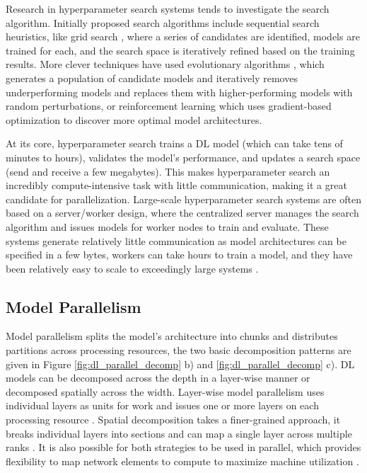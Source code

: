 Research in hyperparameter search systems tends to investigate the search algorithm. 
Initially proposed search algorithms include sequential search heuristics, like grid search \cite{Hadjis2016Omnivore}, where a series of candidates are identified, models are trained for each, and the search space is iteratively refined based on the training results.
More clever techniques have used evolutionary algorithms \cite{Young2017EvolveNLWithHPC, Real2017LargeScaleEvolutionOfCV}, which generates a population of candidate models and iteratively removes underperforming models and replaces them with higher-performing models with random perturbations, or reinforcement learning \cite{Zoph2017NeuralArchSearchReinformceLearn} which uses gradient-based optimization to discover more optimal model architectures.

At its core, hyperparameter search trains a \gls{DL} model (which can take tens of minutes to hours), validates the model's performance, and updates a search space (send and receive a few megabytes).
This makes hyperparameter search an incredibly compute-intensive task with little communication, making it a great candidate for parallelization.
Large-scale hyperparameter search systems are often based on a server/worker design, where the centralized server manages the search algorithm and issues models for worker nodes to train and evaluate.
These systems generate relatively little communication as model architectures can be specified in a few bytes, workers can take hours to train a model, and they have been relatively easy to scale to exceedingly large systems \cite{Young2017EvolveNLWithHPC}.

\subsection{Model Parallelism}


Model parallelism splits the model's architecture into chunks and distributes partitions across processing resources, the two basic decomposition patterns are given in Figure \ref{fig:dl_parallel_decomp} b) and \ref{fig:dl_parallel_decomp} c).
\gls{DL} models can be decomposed across the depth in a layer-wise manner or decomposed spatially across the width.
Layer-wise model parallelism uses individual layers as units for work and issues one or more layers on each processing resource \cite{Abadi2015TensorflowWhitepaper}. 
Spatial decomposition takes a finer-grained approach, it breaks individual layers into sections and can map a single layer across multiple ranks \cite{VanEssen2015LBANN}.
It is also possible for both strategies to be used in parallel, which provides flexibility to map network elements to compute to maximize machine utilization \cite{Dean2012DistBelif}.

